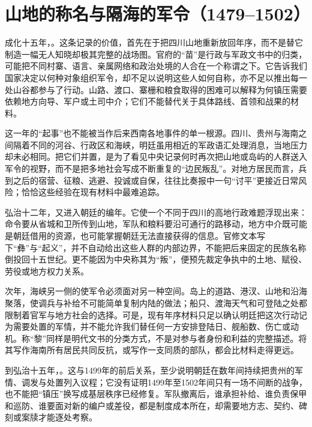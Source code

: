 \section{山地的称名与隔海的军令（1479--1502）}

成化十五年，。这条记录的价值，首先在于把四川山地重新放回年序，而不是替它制造一幅无人知晓却极其完整的战场图。官府的“苗”是行政与军政文书中的归类，可能把不同村寨、语言、亲属网络和政治处境的人合在一个称谓之下。它告诉我们国家决定以何种对象组织军令，却不足以说明这些人如何自称，亦不足以推出每一处山谷都参与了行动。山路、渡口、寨栅和粮食取得的困难可以解释为何镇压需要依赖地方向导、军户或土司中介；它们不能替代关于具体路线、首领和战果的材料。

这一年的“起事”也不能被当作后来西南各地事件的单一根源。四川、贵州与海南之间隔着不同的河谷、行政区和海峡，明廷虽用相近的军政语汇处理消息，当地压力却未必相同。把它们并置，是为了看见中央记录何时再次把山地或岛屿的人群送入军令的视野，而不是把多地社会写成不断重复的“边民叛乱”。对地方居民而言，兵到之后的宿营、征粮、逃避、投诚或自保，往往比奏报中一句“讨平”更接近日常风险；恰恰这些经验在现有材料中最难追踪。

弘治十二年，又进入朝廷的编年。它使一个不同于四川的高地行政难题浮现出来：命令要从省城和卫所传到山地，军队和粮料要沿可通行的路移动，地方中介既可能是朝廷借用的资源，也可能掌握朝廷无法直接获得的信息。官修文本写下“彝”与“起义”，并不自动给出这些人群的内部边界，不能把后来固定的民族名称倒投回十五世纪。更不能因为中央称其为“叛”，便预先裁定争执中的土地、赋役、劳役或地方权力关系。

次年，海峡另一侧的使军令必须面对另一种空间。岛上的道路、港汊、山地和沿海聚落，使调兵与补给不可能简单复制内陆的做法；船只、渡海天气和可登陆之处都限制着官军与地方社会的选择。可是，现有年序材料只足以确认明廷把这次行动记为需要处置的军情，并不能允许我们替任何一方安排登陆日、舰船数、伤亡或动机。称“黎”同样是明代文书的分类方式，不是对参与者身份和利益的完整描述。将其写作海南所有居民共同反抗，或写作一支同质的部队，都会比材料走得更远。

到弘治十五年，。这与1499年的前后关系，至少说明朝廷在数年间持续把贵州的军情、调发与处置列入议程；它没有证明1499年至1502年间只有一场不间断的战争，也不能把“镇压”换写成基层秩序已经修复。军队撤离后，谁承担补给、谁负责保甲和巡防、谁要面对新的编户或差役，都是制度成本所在，却需要地方志、契约、碑刻或案牍才能逐处考察。

